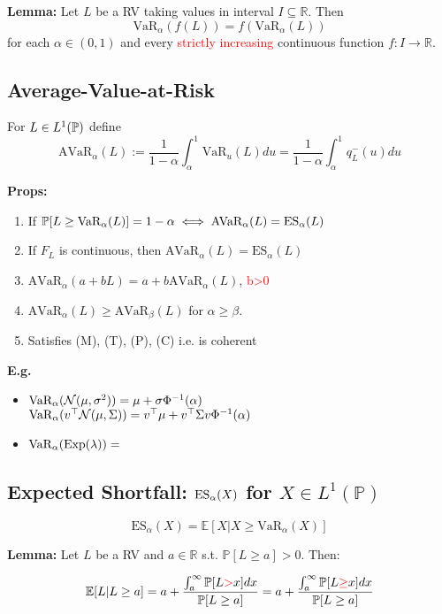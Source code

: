 \textbf{Lemma:} Let $L$ be a RV taking values in interval $I \subseteq
\mathbb{R}$. Then
\[
  \text{VaR}_\alpha(f(L)) = f(\text{VaR}_\alpha(L))
\]
for each $\alpha \in (0, 1)$ and every \textcolor{red}{strictly increasing} continuous function
$f: I \to \mathbb{R}$.

\subsection*{Average-Value-at-Risk}
For $L \in L^1(\mathbb{P})$ define
\[
    \text{AVaR}_\alpha(L) := \frac{1}{1-\alpha}\int_\alpha^1
    \text{VaR}_u(L)du
    = \frac{1}{1-\alpha}\int_\alpha^1 q_L^{-}(u)du
\]

\textbf{Props:}
\begin{enumerate}
    \item If $\mathbb{P}[L \geq \text{VaR}_\alpha(L)] = 1 - \alpha \iff \text{AVaR}_\alpha(L) = \text{ES}_\alpha(L)$
    \item If $F_L$ is continuous, then
        $\text{AVaR}_\alpha(L) = \text{ES}_\alpha(L)$
    \item $\text{AVaR}_\alpha(a + bL) = a + b\text{AVaR}_\alpha(L)$, \quad \textcolor{red}{b>0}
    \item $\text{AVaR}_\alpha(L) \geq \text{AVaR}_\beta(L)$ for $\alpha \geq \beta$.
    \item Satisfies (M), (T), (P), (C) i.e. is coherent
\end{enumerate}

\textbf{E.g.}
\begin{itemize}
    \item $\text{VaR}_\alpha(\mathcal{N}(\mu,\sigma^2))=\mu+\sigma\Phi^{-1}(\alpha)$\\ $\text{VaR}_\alpha(v^\top\mathcal{N}(\mu,\Sigma))=v^\top\mu+v^\top\Sigma v\Phi^{-1}(\alpha)$
    \item $\text{VaR}_\alpha(\text{Exp}(\lambda))=$
\end{itemize}

\subsection*{Expected Shortfall: $\text{ES}_\alpha(X)$ for $X\in L^1(\mathbb{P})$}
\[
  \text{ES}_\alpha(X) = \mathbb{E}[X | X \geq \text{VaR}_\alpha(X)]
\]

\textbf{Lemma:} Let $L$ be a RV and $a\in \mathbb{R}$ s.t. $\mathbb{P}[L \geq a] > 0$. Then:

\begin{align*}
    \mathbb{E}[L | L \geq a] = a + \frac{\int_a^\infty \mathbb{P}[L \textcolor{red}{>} x]dx}
    {\mathbb{P}[L \geq a]}
    = a + \frac{\int_a^\infty \mathbb{P}[L \textcolor{red}{\geq} x]dx}
    {\mathbb{P}[L \geq a]}
\end{align*}

